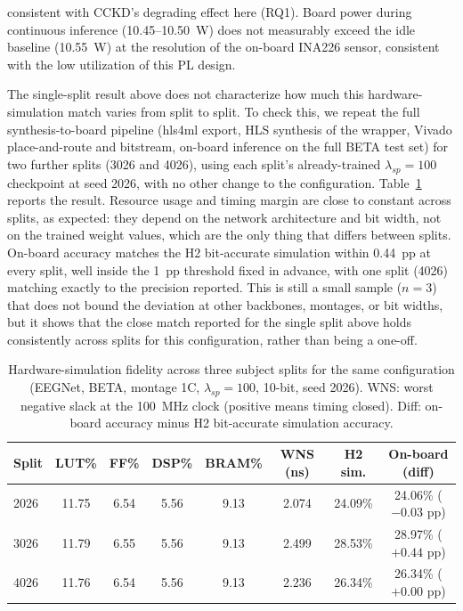 \documentclass[11pt,a4paper,twoside,asymmetric]{article}
\begin{document}
consistent with CCKD's degrading effect here (RQ1). Board power during continuous inference (10.45--10.50~W) does not measurably exceed the idle baseline (10.55~W) at the resolution of the on-board INA226 sensor, consistent with the low utilization of this PL design.

The single-split result above does not characterize how much this hardware-simulation match varies from split to split. To check this, we repeat the full synthesis-to-board pipeline (hls4ml export, HLS synthesis of the wrapper, Vivado place-and-route and bitstream, on-board inference on the full BETA test set) for two further splits (3026 and 4026), using each split's already-trained $\lambda_{sp}=100$ checkpoint at seed 2026, with no other change to the configuration. Table~\ref{tab:plvariability} reports the result. Resource usage and timing margin are close to constant across splits, as expected: they depend on the network architecture and bit width, not on the trained weight values, which are the only thing that differs between splits. On-board accuracy matches the H2 bit-accurate simulation within 0.44~pp at every split, well inside the 1~pp threshold fixed in advance, with one split (4026) matching exactly to the precision reported. This is still a small sample ($n=3$) that does not bound the deviation at other backbones, montages, or bit widths, but it shows that the close match reported for the single split above holds consistently across splits for this configuration, rather than being a one-off.

\begin{table}[htbp]
\caption{Hardware-simulation fidelity across three subject splits for the same configuration (EEGNet, BETA, montage 1C, $\lambda_{sp}=100$, 10-bit, seed 2026). WNS: worst negative slack at the 100~MHz clock (positive means timing closed). Diff: on-board accuracy minus H2 bit-accurate simulation accuracy.}
\label{tab:plvariability}
\begin{center}
\footnotesize
\begin{tabular}{lccccccc}
\toprule
Split & LUT\% & FF\% & DSP\% & BRAM\% & WNS (ns) & H2 sim. & On-board (diff) \\
\midrule
2026 & 11.75 & 6.54 & 5.56 & 9.13 & 2.074 & 24.09\% & 24.06\% ($-0.03$ pp) \\
3026 & 11.79 & 6.55 & 5.56 & 9.13 & 2.499 & 28.53\% & 28.97\% ($+0.44$ pp) \\
4026 & 11.76 & 6.54 & 5.56 & 9.13 & 2.236 & 26.34\% & 26.34\% ($+0.00$ pp) \\
\bottomrule
\end{tabular}
\end{center}
\end{table}
\end{document}
